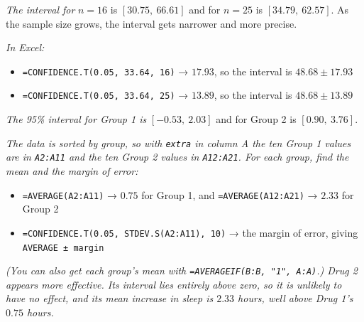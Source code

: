 \documentclass[
  11pt,
  letterpaper,
  DIV=11,
  numbers=noendperiod,
  oneside,
  open=any]{scrreprt}
\providecommand{\tightlist}{%
  \setlength{\itemsep}{0pt}\setlength{\parskip}{0pt}}\usepackage{longtable,booktabs,array}
\newenvironment{bsanswerkey}[2]{%
  \begin{tcolorbox}[bsbase, colback=bspaper2, colframe=bsline, fontupper=\small,
    title={\hypertarget{a-#1}{}\label{a-#1}\hyperlink{q-#1}{\textcolor{bsink2}{\MakeUppercase{#2}}}\hfill
      \hyperlink{q-#1}{\textcolor{bsaccent}{\normalfont\footnotesize back to page \pageref{q-#1}}}}]}%
  {\end{tcolorbox}}
\begin{document}
\begin{bsanswerkey}{bsans118}{Exercise 2, question 2}

\emph{The interval for} \(n = 16\) is \([30.75,\ 66.61]\) and for
\(n = 25\) is \([34.79,\ 62.57]\). As the sample size grows, the
interval gets narrower and more precise.

\emph{In Excel:}

\begin{itemize}
\tightlist
\item
  \texttt{=CONFIDENCE.T(0.05,\ 33.64,\ 16)} → \(17.93\), so the interval
  is \(48.68 \pm 17.93\)
\item
  \texttt{=CONFIDENCE.T(0.05,\ 33.64,\ 25)} → \(13.89\), so the interval
  is \(48.68 \pm 13.89\)
\end{itemize}

\end{bsanswerkey}

\begin{bsanswerkey}{bsans119}{Exercise 3}

\emph{The 95\% interval for Group 1 is} \([-0.53,\ 2.03]\) and for Group
2 is \([0.90,\ 3.76]\).

\emph{The data is sorted by group, so with \texttt{extra} in column A
the ten Group 1 values are in \texttt{A2:A11} and the ten Group 2 values
in \texttt{A12:A21}. For each group, find the mean and the margin of
error:}

\begin{itemize}
\tightlist
\item
  \texttt{=AVERAGE(A2:A11)} → \(0.75\) for Group 1, and
  \texttt{=AVERAGE(A12:A21)} → \(2.33\) for Group 2
\item
  \texttt{=CONFIDENCE.T(0.05,\ STDEV.S(A2:A11),\ 10)} → the margin of
  error, giving \texttt{AVERAGE\ ±\ margin}
\end{itemize}

\emph{(You can also get each group's mean with
\texttt{=AVERAGEIF(B:B,\ "1",\ A:A)}.) Drug 2 appears more effective.
Its interval lies entirely above zero, so it is unlikely to have no
effect, and its mean increase in sleep is \(2.33\) hours, well above
Drug 1's \(0.75\) hours.}

\end{bsanswerkey}
\end{document}
